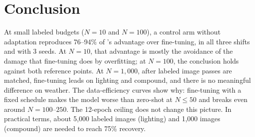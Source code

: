 \section{Conclusion}\label{sec:conclusion}

At small labeled budgets ($N = 10$ and $N = 100$), a control arm without adaptation reproduces 76--94\% of \aldi's advantage over fine-tuning, in all three shifts and with 3 seeds. At $N = 10$, that advantage is mostly the avoidance of the damage that fine-tuning does by overfitting; at $N = 100$, the conclusion holds against both reference points. At $N = 1{,}000$, after labeled image passes are matched, fine-tuning leads \aldi on lighting and compound, and there is no meaningful difference on weather. The data-efficiency curves show why: fine-tuning with a fixed schedule makes the model worse than zero-shot at $N \leq 50$ and breaks even around $N = 100$--$250$. The 12-epoch ceiling does not change this picture. In practical terms, about 5,000 labeled images (lighting) and 1,000 images (compound) are needed to reach 75\% recovery.
